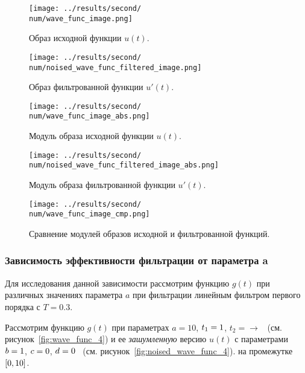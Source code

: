 \begin{figure}[ht!]
    \centering
    \texttt{[image: ../results/second/\\num/wave\_func\_image.png]}
    \caption{Образ исходной функции $u(t)$.}
    \label{fig:wave_func_image_\num}
\end{figure}

\begin{figure}[ht!]
    \centering
    \texttt{[image: ../results/second/\\num/noised\_wave\_func\_filtered\_image.png]}
    \caption{Образ фильтрованной функции $u'(t)$.}
    \label{fig:noised_wave_func_filtered_image_\num}
\end{figure}

\begin{figure}[ht!]
    \centering
    \texttt{[image: ../results/second/\\num/wave\_func\_image\_abs.png]}
    \caption{Модуль образа исходной функции $u(t)$.}
    \label{fig:wave_func_image_abs_\num}
\end{figure}

\begin{figure}[ht!]
    \centering
    \texttt{[image: ../results/second/\\num/noised\_wave\_func\_filtered\_image\_abs.png]}
    \caption{Модуль образа фильтрованной функции $u'(t)$.}
    \label{fig:noised_wave_func_filtered_image_abs_\num}
\end{figure}

\begin{figure}[ht!]
    \centering
    \texttt{[image: ../results/second/\\num/wave\_func\_image\_cmp.png]}
    \caption{Сравнение модулей образов исходной и фильтрованной функций.}
    \label{fig:wave_func_image_cmp_\num}
\end{figure}


\FloatBarrier
\subsubsection{Зависимость эффективности фильтрации от параметра a}
\def\T{0.3}
Для исследования данной зависимости рассмотрим функцию $g(t)$ при различных значениях параметра $a$ 
при фильтрации линейным фильтром первого порядка с $T = \T$. 

\def\num{4}
\def\a{10}
Рассмотрим функцию $g(t)$ при параметрах $a=\a$, $t_1 = 1$, $t_2 = \to$ ~(см. рисунок~\ref{fig:wave_func_\num}) 
и ее \textit{зашумленную} версию $u(t)$ с параметрами $b = 1$, $c = 0$, $d = 0$ ~(см. рисунок~\ref{fig:noised_wave_func_\num}).
на промежутке $[0,10]$. 

